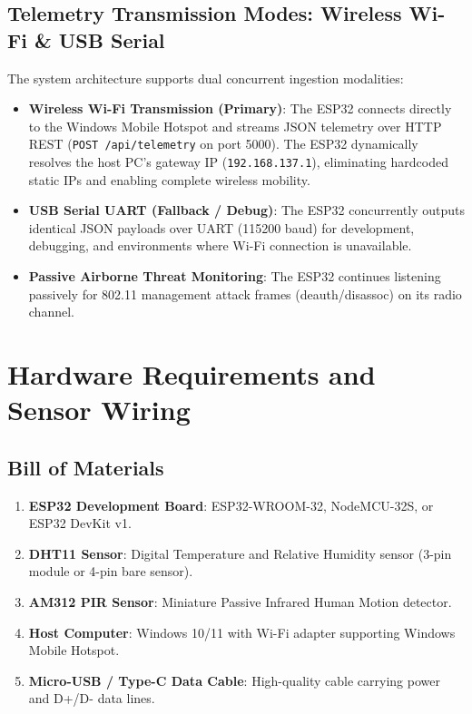 \documentclass[11pt,a4paper]{article}
\begin{document}
\subsection{Telemetry Transmission Modes: Wireless Wi-Fi \& USB Serial}
The system architecture supports dual concurrent ingestion modalities:
\begin{itemize}[noitemsep]
    \item \textbf{Wireless Wi-Fi Transmission (Primary)}: The ESP32 connects directly to the Windows Mobile Hotspot and streams JSON telemetry over HTTP REST (\texttt{POST /api/telemetry} on port 5000). The ESP32 dynamically resolves the host PC's gateway IP (\texttt{192.168.137.1}), eliminating hardcoded static IPs and enabling complete wireless mobility.
    \item \textbf{USB Serial UART (Fallback / Debug)}: The ESP32 concurrently outputs identical JSON payloads over UART (115200 baud) for development, debugging, and environments where Wi-Fi connection is unavailable.
    \item \textbf{Passive Airborne Threat Monitoring}: The ESP32 continues listening passively for 802.11 management attack frames (deauth/disassoc) on its radio channel.
\end{itemize}

\section{Hardware Requirements and Sensor Wiring}

\subsection{Bill of Materials}
\begin{enumerate}[noitemsep]
    \item \textbf{ESP32 Development Board}: ESP32-WROOM-32, NodeMCU-32S, or ESP32 DevKit v1.
    \item \textbf{DHT11 Sensor}: Digital Temperature and Relative Humidity sensor (3-pin module or 4-pin bare sensor).
    \item \textbf{AM312 PIR Sensor}: Miniature Passive Infrared Human Motion detector.
    \item \textbf{Host Computer}: Windows 10/11 with Wi-Fi adapter supporting Windows Mobile Hotspot.
    \item \textbf{Micro-USB / Type-C Data Cable}: High-quality cable carrying power and D+/D- data lines.
\end{enumerate}
\end{document}
